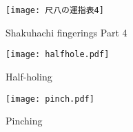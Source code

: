 \begin{figure}[H]
	\centering
	\texttt{[image: 尺八の運指表4]}
	\caption{Shakuhachi fingerings Part 4}
	\label{fig:shakuhachi_fingerings_4}
\end{figure}

\vfill

\begin{figure}
	\centering
	\begin{minipage}{0.9\textwidth}
	\centering
	\texttt{[image: halfhole.pdf]}
	\caption{Half-holing} \label{fig:half-holing}
	\texttt{[image: pinch.pdf]}
	\caption{Pinching} \label{fig:pinching}
	\end{minipage}
\end{figure}
